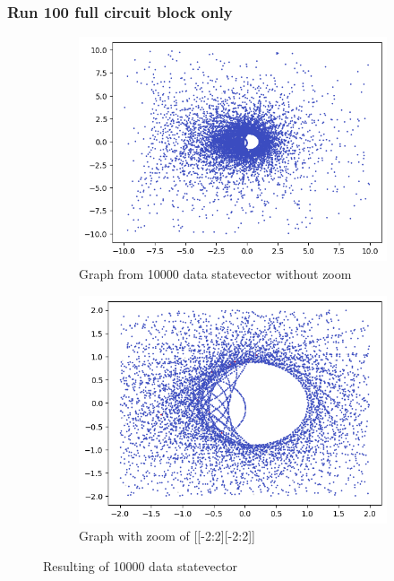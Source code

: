 \subsubsection{Run 100 full circuit block only}
\begin{figure}[ht!]
        \centering
        \begin{subfigure}[c]{0.5\textwidth}
                \includegraphics[width=\textwidth]{Chapitre1/Figures/exp1_100_base0_nonZoom.png}
                \caption{Graph from 10000 data statevector without zoom}
        \end{subfigure}%
        \begin{subfigure}[c]{0.5\textwidth}
                \includegraphics[width=\textwidth]{Chapitre1/Figures/exp1_100_base0_zoom.png}
                \caption{Graph with zoom of [[-2:2][-2:2]]}
        \end{subfigure}
        \caption{Resulting of 10000 data statevector}
\end{figure}

